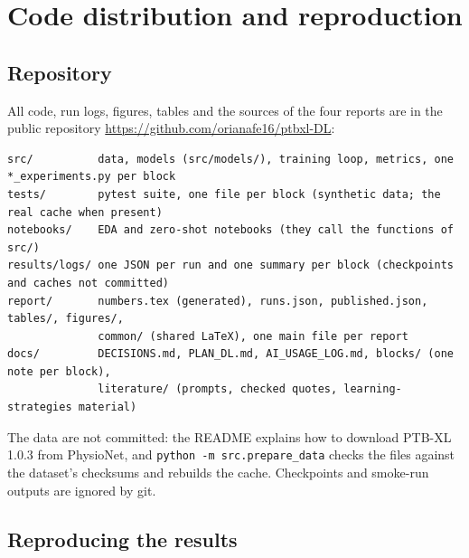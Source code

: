 \section{Code distribution and reproduction}\label{sec:code}

\subsection{Repository}

All code, run logs, figures, tables and the sources of the four reports are in the public repository
\url{https://github.com/orianafe16/ptbxl-DL}:

\begin{lstlisting}[language={},numbers=none,caption={Structure of the repository.},label={lst:tree}]
src/          data, models (src/models/), training loop, metrics, one *_experiments.py per block
tests/        pytest suite, one file per block (synthetic data; the real cache when present)
notebooks/    EDA and zero-shot notebooks (they call the functions of src/)
results/logs/ one JSON per run and one summary per block (checkpoints and caches not committed)
report/       numbers.tex (generated), runs.json, published.json, tables/, figures/,
              common/ (shared LaTeX), one main file per report
docs/         DECISIONS.md, PLAN_DL.md, AI_USAGE_LOG.md, blocks/ (one note per block),
              literature/ (prompts, checked quotes, learning-strategies material)
\end{lstlisting}

The data are not committed: the README explains how to download PTB-XL 1.0.3 from PhysioNet, and
\texttt{python -m src.prepare\_data} checks the files against the dataset's checksums and rebuilds the
cache. Checkpoints and smoke-run outputs are ignored by git.

\subsection{Reproducing the results}

